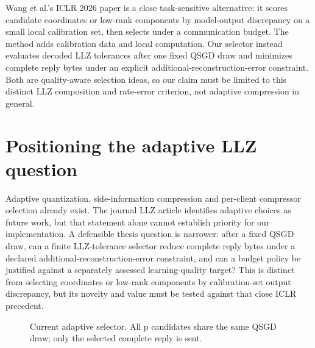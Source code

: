 Wang et al.'s ICLR 2026 paper is a close task-sensitive alternative: it scores candidate coordinates or low-rank components by model-output discrepancy on a small local calibration set, then selects under a communication budget. The method adds calibration data and local computation. Our selector instead evaluates decoded LLZ tolerances after one fixed QSGD draw and minimizes complete reply bytes under an explicit additional-reconstruction-error constraint. Both are quality-aware selection ideas, so our claim must be limited to this distinct LLZ composition and rate-error criterion, not adaptive compression in general. \parencite{wang2026discrepancy}

\section{Positioning the adaptive LLZ question}

Adaptive quantization, side-information compression and per-client compressor selection already exist. The journal LLZ article identifies adaptive choices as future work, but that statement alone cannot establish priority for our implementation. A defensible thesis question is narrower: after a fixed QSGD draw, can a finite LLZ-tolerance selector reduce complete reply bytes under a declared additional-reconstruction-error constraint, and can a budget policy be justified against a separately assessed learning-quality target? This is distinct from selecting coordinates or low-rank components by calibration-set output discrepancy, but its novelty and value must be tested against that close ICLR precedent. \parencite{cao2026llz,wang2026discrepancy}

\begin{figure}[htbp]\centering
{}
\caption{Current adaptive selector. All p candidates share the same QSGD draw; only the selected complete reply is sent.}
\label{fig:adaptive}
\end{figure}

